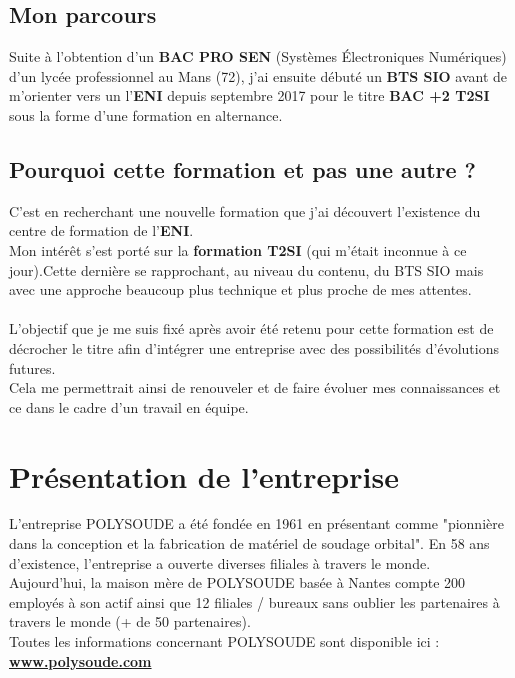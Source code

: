 \documentclass[11pt,a4paper,oneside]{article}
\begin{document}
\subsection*{Mon parcours}
Suite à l’obtention d’un \textbf{BAC PRO SEN} (Systèmes Électroniques Numériques) d'un lycée professionnel au Mans (72), j’ai ensuite débuté un \textbf{BTS SIO} avant de m’orienter vers un l'\textbf{ENI} depuis septembre 2017 pour le titre \textbf{BAC +2 T2SI} sous la forme d'une formation en alternance.

\subsection*{Pourquoi cette formation et pas une autre ?}

C'est en recherchant une nouvelle formation que j'ai découvert l'existence du centre de formation de l'\textbf{ENI}.\\

Mon intérêt s’est porté sur la \textbf{formation T2SI} (qui m'était inconnue à ce jour).Cette dernière se rapprochant, au niveau du contenu, du BTS SIO mais avec une approche beaucoup plus technique et plus proche de mes attentes. \\
\\
L’objectif que je me suis fixé après avoir été retenu pour cette formation est de décrocher le titre afin d’intégrer une entreprise avec des possibilités d’évolutions futures.\\
Cela me permettrait ainsi de renouveler et de faire évoluer mes connaissances et ce dans le cadre d’un travail en équipe.
\newpage

\section{Présentation de l'entreprise}
L'entreprise POLYSOUDE a été fondée en 1961 en présentant comme "pionnière dans la conception et la fabrication de matériel de soudage orbital". En 58 ans d'existence, l'entreprise a ouverte diverses filiales à travers le monde.\\

Aujourd'hui, la maison mère de POLYSOUDE basée à Nantes compte 200 employés à son actif ainsi que 12 filiales / bureaux sans oublier les partenaires à travers le monde (+ de 50 partenaires). \\

Toutes les informations concernant POLYSOUDE sont disponible ici : \textbf{\hyperlink{https://www.polysoude.com/}{www.polysoude.com}}
\end{document}
